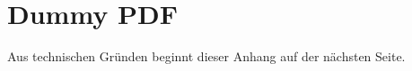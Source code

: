 
\section{Dummy PDF}\label{sec:dummy-pdf}

Aus technischen Gründen beginnt dieser Anhang auf der nächsten Seite.


